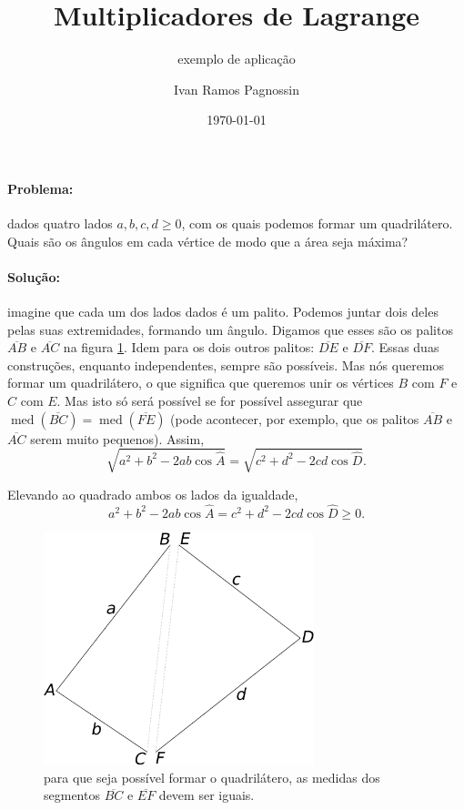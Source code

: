 \documentclass[a4paper,12pt]{scrartcl}
\title{Multiplicadores de Lagrange}
\subtitle{exemplo de aplicação}
\author{Ivan Ramos Pagnossin}
\date{\today}
\DeclareMathOperator{\med}{med}
\begin{document}
  \maketitle

  \paragraph{Problema:} dados quatro lados $a, b, c, d \ge 0$, com os quais podemos formar um quadrilátero. Quais são os ângulos em cada vértice de modo que a área seja máxima?

  
  \paragraph{Solução:} imagine que cada um dos lados dados é um palito. Podemos juntar dois deles pelas suas extremidades, formando um ângulo. Digamos que esses são os palitos $\overline{AB}$ e $\overline{AC}$ na figura \ref{fig:formacao-quadrilatero}. Idem para os dois outros palitos: $\overline{DE}$ e $\overline{DF}$. Essas duas construções, enquanto independentes, sempre são possíveis. Mas nós queremos formar um quadrilátero, o que significa que queremos unir os vértices $B$ com $F$ e $C$ com $E$. Mas isto só será possível se for possível assegurar que $\med\left(\overline{BC}\right) = \med \left(\overline{FE}\right)$ (pode acontecer, por exemplo, que os palitos $\overline{AB}$ e $\overline{AC}$ serem muito pequenos). Assim,
  \begin{equation*}
    \sqrt{a^2 + b^2 - 2ab\cos \hat A} = \sqrt{c^2 + d^2 - 2cd\cos \hat D}.
  \end{equation*}
  
  Elevando ao quadrado ambos os lados da igualdade,
  \begin{equation}\label{eq:proposicao}
    a^2 + b^2 - 2ab\cos \hat A = c^2 + d^2 - 2cd\cos \hat D \ge 0.
  \end{equation}
  
  \begin{figure}
    \centering
   \includegraphics[width=0.7\textwidth]{figura1.png}
   \caption{para que seja possível formar o quadrilátero, as medidas dos segmentos $\overline{BC}$ e $\overline{EF}$ devem ser iguais.}
   \label{fig:formacao-quadrilatero}
  \end{figure}
  
\end{document}
